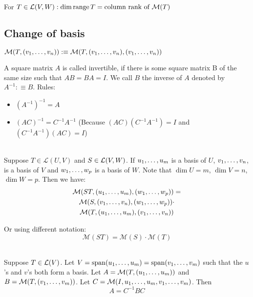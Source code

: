 \setcounter{thm}{77}
\begin{thm}
    For $T \in {\mathcal{L}(V,W)}: \dim \operatorname{range} T = \text{column rank of } \mathcal{M} (T)$
\end{thm}

\subsection{Change of basis}

\begin{mydef-non}
    $\mathcal{M}(T, (v_1, \dots, v_n)) :\equiv \mathcal{M}(T, (v_1, \dots, v_n),(v_1, \dots, v_n))$
\end{mydef-non}

\setcounter{thm}{79}
\begin{thm}
    A square matrix $A$ is called invertible, if there is some square matrix B of the same size such that $AB=BA=I$. We call $B$ the inverse of $A$ denoted by $A^{-1} :\equiv B$. Rules:
    \begin{itemize}
    	\item $(A^{-1})^{-1}=A$
    	\item $(AC)^{-1} = C^{-1}A^{-1}$ (Because $(AC)(C^{-1}A^{-1})=I$ and $(C^{-1}A^{-1})(AC)=I$)
    \end{itemize}
\end{thm}

\begin{thm}
     \\
    Suppose $T\in \mathcal{L}(U,V)$ and $S\in {\mathcal{L}(V,W)}$. If $u_1, \dots, u_m$ is a basis of $U$, $v_1, \dots, v_n$, is a basis of $V$ and $w_1, \dots, w_{p}$ is a basis of $W$. Note that $\dim U = m$, $\dim V = n$, $\dim W = p$. Then we have:
    \begin{multline}
    	\mathcal{M}(ST, (u_1, \dots, u_m), (w_1, \dots, w_{p})) = \\
    	\mathcal{M}(S, (v_1, \dots, v_n), (w_1, \dots, w_{p})) \cdot \\
    	\mathcal{M}(T, (u_1, \dots, u_m), (v_1, \dots, v_n))
    \end{multline}

    Or using different notation:
    \begin{equation}
        \mathcal{M}(ST) = \mathcal{M}(S) \cdot \mathcal{M}(T)
    \end{equation}
\end{thm}

\setcounter{thm}{83}
\begin{thm}
    \\
    Suppose $T \in \mathcal{L}(V)$. Let
    $V = \operatorname{span} (u_1, \dots, u_m) = \operatorname{span} (v_1, \dots, v_m)$ such that the $u$'s and $v$'s both form a basis. Let $A=\mathcal{M}(T, (u_1, \dots, u_m))$ and $B=\mathcal{M}(T,(v_1, \dots, v_m))$. Let
    $C=\mathcal{M}(I, u_1, \dots, u_m, v_1, \dots, v_m)$. Then
    \begin {equation}
        A = C^{-1} B C
    \end {equation}
\end{thm}

